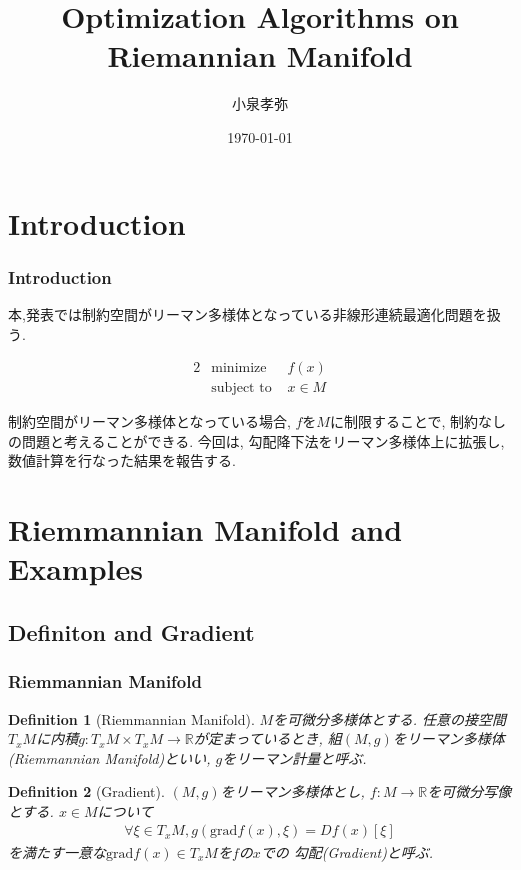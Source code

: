 \documentclass[dvipdfmx,11pt]{beamer}		%
\title{Optimization Algorithms on Riemannian Manifold}
\author{小泉孝弥}
\institute{立命館大学大学院 修士2年}
\date{\today}
\makeatletter
\newtheorem{defi}{Definition}
\newcommand{\R}{\mathbb{R}}
\newcommand{\tpm}{T_xM}
\newcounter{mpproblem}[section]
\newenvironment{mpproblem}[1]%
{%
    \protected@edef\@currentlabelname{#1}%
    \par\vspace{\baselineskip}\noindent%
    \ifx#1\empty %
    \else \refstepcounter{mpproblem}$($#1$)$ %
    \fi%
    \hfill%
    $\left|%
    \hfill%
    \hspace{0.00\textwidth}%
    \@fleqntrue\@mathmargin\parindent%
    \begin{minipage}{0.86\textwidth}%
    \vspace{-1.0\baselineskip}%
}%
{%
    \end{minipage}%
    \@fleqnfalse%
    \right.$%
    \par\vspace{\baselineskip}\noindent%
    \ignorespacesafterend%
}%
\newenvironment{mpproblem*}%
{%
    \begin{mpproblem}{}%
}%
{%
    \end{mpproblem}%
    \ignorespacesafterend%
}
\makeatother
\begin{document}
    \begin{frame}\frametitle{}
        \titlepage
    \end{frame}

    \section{Introduction}
    \begin{frame}
        \frametitle{Introduction}
        本,発表では制約空間がリーマン多様体となっている非線形連続最適化問題を扱う. 
        \begin{mpproblem*}
            \begin{alignat*}{2}
                &\text{minimize}   & f(x)  \\
                &\text{subject to } & x\in M  
            \end{alignat*}
        \end{mpproblem*}
        制約空間がリーマン多様体となっている場合, $f$を$M$に制限することで, 制約なしの問題と考えることができる. 
        今回は, 勾配降下法をリーマン多様体上に拡張し, 数値計算を行なった結果を報告する.
    \end{frame}

    \section{Riemmannian Manifold and Examples}
    \subsection{Definiton and Gradient}
    \begin{frame}\frametitle{Riemmannian Manifold}
        \begin{defi}[Riemmannian Manifold]
            $M$を可微分多様体とする. 任意の接空間$\tpm$に内積$g : \tpm\times\tpm\to\R$が定まっているとき, 
            組$(M, g)$をリーマン多様体(Riemmannian Manifold)といい, $g$をリーマン計量と呼ぶ.
        \end{defi}
        \begin{defi}[Gradient]
            $(M, g)$をリーマン多様体とし, $f:M\to\R$を可微分写像とする. $x\in M$について
            \begin{align*}
                \forall\xi\in\tpm, g(\mathrm{grad}f(x), \xi) = Df(x)[\xi]
            \end{align*}
            を満たす一意な$\mathrm{grad}f(x)\in\tpm$を$f$の$x$での
            勾配(Gradient)と呼ぶ.
        \end{defi}
    \end{frame}
\end{document}
